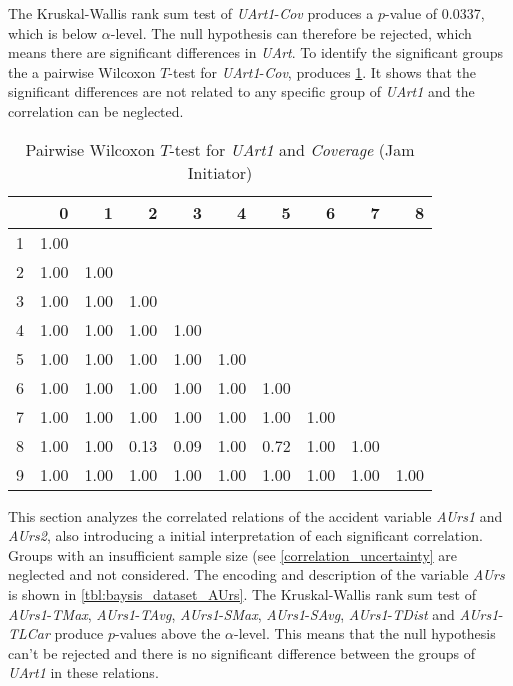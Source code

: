 The Kruskal-Wallis rank sum test of \textit{UArt1}-\textit{Cov} produces a $p$-value of 0.0337, which is below $\alpha$-level. The null hypothesis can therefore be rejected, which means there are significant differences in \textit{UArt}. To identify the significant groups the a pairwise Wilcoxon $T$-test for \textit{UArt1}-\textit{Cov}, produces \cref*{tbl:wilcoxon_baysis_initiator_UArt_Cov}. It shows that the significant differences are not related to any specific group of \textit{UArt1} and the correlation can be neglected. 
\begin{table}[ht!]
	\tiny
	\centering
    \begin{tabular}{rrrrrrrrrr}
        \toprule
          & 0 & 1 & 2 & 3 & 4 & 5 & 6 & 7 & 8 \\ 
        \midrule
        1 & 1.00 &  &  &  &  &  &  &  &  \\ 
        2 & 1.00 & 1.00 &  &  &  &  &  &  &  \\ 
        3 & 1.00 & 1.00 & 1.00 &  &  &  &  &  &  \\ 
        4 & 1.00 & 1.00 & 1.00 & 1.00 &  &  &  &  &  \\ 
        5 & 1.00 & 1.00 & 1.00 & 1.00 & 1.00 &  &  &  &  \\ 
        6 & 1.00 & 1.00 & 1.00 & 1.00 & 1.00 & 1.00 &  &  &  \\ 
        7 & 1.00 & 1.00 & 1.00 & 1.00 & 1.00 & 1.00 & 1.00 &  &  \\ 
        8 & 1.00 & 1.00 & 0.13 & 0.09 & 1.00 & 0.72 & 1.00 & 1.00 &  \\ 
        9 & 1.00 & 1.00 & 1.00 & 1.00 & 1.00 & 1.00 & 1.00 & 1.00 & 1.00 \\ 
        \bottomrule
      \end{tabular}
    \caption{Pairwise Wilcoxon $T$-test for \textit{UArt1} and \textit{Coverage} (Jam Initiator)}
    \label{tbl:wilcoxon_baysis_initiator_UArt_Cov}
\end{table}

This section analyzes the correlated relations of the accident variable \textit{AUrs1} and \textit{AUrs2}, also introducing a initial interpretation of each significant correlation. Groups with an insufficient sample size (see \cref{correlation_uncertainty} are neglected and not considered. The encoding and description of the variable \textit{AUrs} is shown in \cref{tbl:baysis_dataset_AUrs}. The Kruskal-Wallis rank sum test of \textit{AUrs1}-\textit{TMax}, \textit{AUrs1}-\textit{TAvg}, \textit{AUrs1}-\textit{SMax}, \textit{AUrs1}-\textit{SAvg}, \textit{AUrs1}-\textit{TDist} and \textit{AUrs1}-\textit{TLCar} produce $p$-values above the $\alpha$-level. This means that the null hypothesis can't be rejected and there is no significant difference between the groups of \textit{UArt1} in these relations. 

